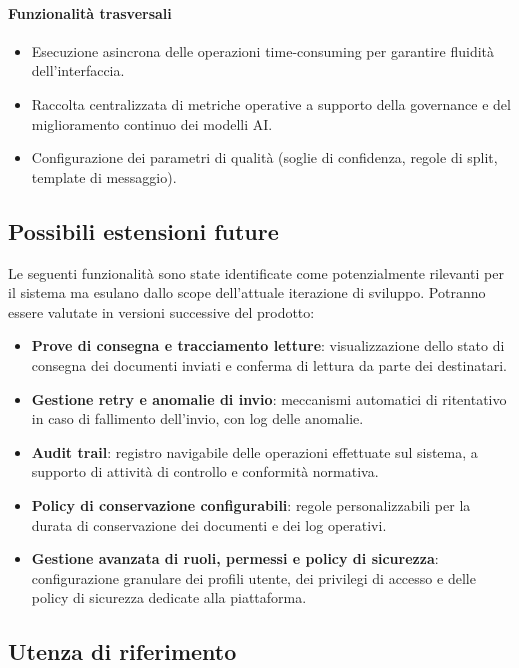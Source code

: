 ﻿\documentclass[a4paper,12pt]{article}
\begin{document}
\paragraph{Funzionalità trasversali}
\begin{itemize}
    \item Esecuzione asincrona delle operazioni time-consuming per garantire fluidità dell'interfaccia.
    \item Raccolta centralizzata di metriche operative a supporto della governance e del miglioramento continuo dei modelli AI.
    \item Configurazione dei parametri di qualità (soglie di confidenza, regole di split, template di messaggio).
\end{itemize}

\subsection{Possibili estensioni future}

Le seguenti funzionalità sono state identificate come potenzialmente rilevanti per il sistema ma esulano dallo scope dell'attuale iterazione di sviluppo. Potranno essere valutate in versioni successive del prodotto:
\begin{itemize}
    \item \textbf{Prove di consegna e tracciamento letture}: visualizzazione dello stato di consegna dei documenti inviati e conferma di lettura da parte dei destinatari.
    \item \textbf{Gestione retry e anomalie di invio}: meccanismi automatici di ritentativo in caso di fallimento dell'invio, con log delle anomalie.
    \item \textbf{Audit trail}: registro navigabile delle operazioni effettuate sul sistema, a supporto di attività di controllo e conformità normativa.
    \item \textbf{Policy di conservazione configurabili}: regole personalizzabili per la durata di conservazione dei documenti e dei log operativi.
    \item \textbf{Gestione avanzata di ruoli, permessi e policy di sicurezza}: configurazione granulare dei profili utente, dei privilegi di accesso e delle policy di sicurezza dedicate alla piattaforma.
\end{itemize}

\subsection{Utenza di riferimento}
\end{document}
